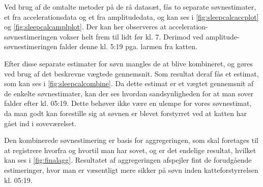 Ved brug af de omtalte metoder på de rå datasæt, fås to separate søvnestimater, et fra accelerationsdata og et fra amplitudedata, og kan ses i \cref{fig:sleepcalcaccplot} og \cref{fig:sleepcalcamplplot}.
Der kan her observeres at acceleration-søvnestimeringen vokser helt frem til lidt før kl. 7.
Derimod ved amplitude-søvnestimeringen falder denne kl. 5:19 pga. larmen fra katten.

Efter disse separate estimater for søvn mangles de at blive kombineret, og gøres ved brug af det beskrevne vægtede gennemsnit.
Som resultat deraf fås et estimat, som kan ses i \cref{fig:sleepcalcombine}.
Da dette estimat er et vægtet gennemsnit af de enkelte søvnestimater, kan der ses hvordan sandsynligheden for at man sover falder efter kl. 05:19.
Dette behøver ikke være en ulempe for vores søvnestimat, da man godt kan forestille sig at søvnen er blevet forstyrret ved at katten har gået ind i soveværelset.

Den kombinerede søvnestimering er basis for aggregeringen, som skal foretages til at registrere hvorfra og hvortil man har sovet, og er det endelige resultat, hvilket kan ses i \cref{fig:finalagg}.
Resultatet af aggregeringen afspejler fint de forudgående estimeringer, hvor man er væsentligt mere sikker på søvn inden katteforstyrrelsen kl. 05:19.